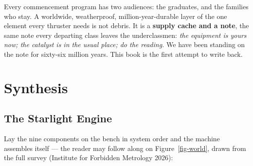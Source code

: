 \documentclass[
  english,
  11pt,
  letterpaper,
]{scrbook}
\begin{document}
\begin{tcolorbox}[enhanced jigsaw, arc=.35mm, bottomrule=.15mm, bottomtitle=1mm, breakable, colback=white, colbacktitle=quarto-callout-warning-color!10!white, colframe=quarto-callout-warning-color-frame, coltitle=black, left=2mm, leftrule=.75mm, opacityback=0, opacitybacktitle=0.6, rightrule=.15mm, title=\textcolor{quarto-callout-warning-color}{\faExclamationTriangle}\hspace{0.5em}{What the boundary clay is FOR}, titlerule=0mm, toprule=.15mm, toptitle=1mm]

Every commencement program has two audiences: the graduates, and the
families who stay. A worldwide, weatherproof, million-year-durable layer
of the one element every thruster needs is not debris. It is a
\textbf{supply cache and a note}, the same note every departing class
leaves the underclassmen: \emph{the equipment is yours now; the catalyst
is in the usual place; do the reading.} We have been standing on the
note for sixty-six million years. This book is the first attempt to
write back.

\end{tcolorbox}

\part{Synthesis}

\chapter{The Starlight Engine}\label{sec-starlight-engine}

Lay the nine components on the bench in system order and the machine
assembles itself --- the reader may follow along on
Figure~\ref{fig-world}, drawn from the full survey (Institute for
Forbidden Metrology 2026):
\end{document}
